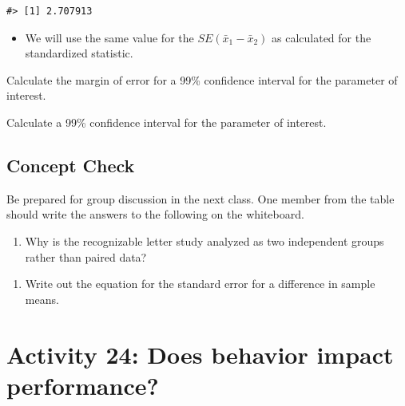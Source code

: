 \documentclass[
]{report}
\providecommand{\tightlist}{%
  \setlength{\itemsep}{0pt}\setlength{\parskip}{0pt}}
\begin{document}
\begin{verbatim}
#> [1] 2.707913
\end{verbatim}

\begin{itemize}
\tightlist
\item
  We will use the same value for the \(SE(\bar{x}_1-\bar{x}_2)\) as calculated for the standardized statistic.
\end{itemize}

\vspace{1in}

Calculate the margin of error for a 99\% confidence interval for the parameter of interest.

\vspace{0.5in}

Calculate a 99\% confidence interval for the parameter of interest.

\vspace{0.6in}

\subsection{Concept Check}\label{concept-check-10}

Be prepared for group discussion in the next class. One member from the table should write the answers to the following on the whiteboard.

\begin{enumerate}
\def\labelenumi{\arabic{enumi}.}
\tightlist
\item
  Why is the recognizable letter study analyzed as two independent groups rather than paired data?
\end{enumerate}

\vspace{0.6in}

\begin{enumerate}
\def\labelenumi{\arabic{enumi}.}
\setcounter{enumi}{1}
\tightlist
\item
  Write out the equation for the standard error for a difference in sample means.
\end{enumerate}

\vspace{1in}

\newpage

\section{Activity 24: Does behavior impact performance?}\label{activity-24-does-behavior-impact-performance}
\end{document}
